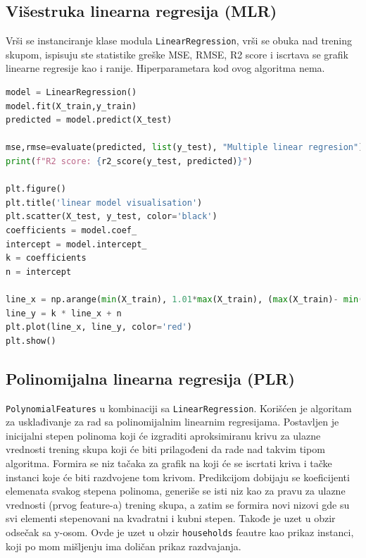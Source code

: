\documentclass[fontsize=12bp, paper=a4]{scrarticle}
\begin{document}
\subsection{Višestruka linearna regresija (MLR)}

Vrši se instanciranje klase modula \verb|LinearRegression|, vrši se obuka nad trening skupom, ispisuju ste statistike greške MSE, RMSE, R2 score i iscrtava se grafik linearne regresije kao i ranije. Hiperparametara kod ovog algoritma nema.

\begin{lstlisting}[language=Python, caption=Postupak MLR-a]
model = LinearRegression()
model.fit(X_train,y_train)
predicted = model.predict(X_test)

mse,rmse=evaluate(predicted, list(y_test), "Multiple linear regresion")
print(f"R2 score: {r2_score(y_test, predicted)}")

plt.figure()
plt.title('linear model visualisation')
plt.scatter(X_test, y_test, color='black')
coefficients = model.coef_
intercept = model.intercept_
k = coefficients
n = intercept

line_x = np.arange(min(X_train), 1.01*max(X_train), (max(X_train)- min(X_train))/10)
line_y = k * line_x + n
plt.plot(line_x, line_y, color='red')
plt.show()
\end{lstlisting}

\subsection{Polinomijalna linearna regresija (PLR)}

\verb|PolynomialFeatures|\cite{plr} u kombinaciji sa \verb|LinearRegression|. Korišćen je algoritam za usklađivanje za rad sa polinomijalnim linearnim regresijama. Postavljen je inicijalni stepen polinoma koji će izgraditi aproksimiranu krivu za ulazne vrednosti trening skupa koji će biti prilagođeni da rade nad takvim tipom algoritma. Formira se niz tačaka za grafik na koji će se iscrtati kriva i tačke instanci koje će biti razdvojene tom krivom. Predikcijom dobijaju se koeficijenti elemenata svakog stepena polinoma, generiše se isti niz kao za pravu za ulazne vrednosti (prvog feature-a) trening skupa, a zatim se formira novi nizovi gde su svi elementi stepenovani na kvadratni i kubni stepen. Takođe je uzet u obzir odsečak sa y-osom. 
Ovde je uzet u obzir \verb|households| feautre kao prikaz instanci, koji po mom mišljenju ima doličan prikaz razdvajanja.
\end{document}
